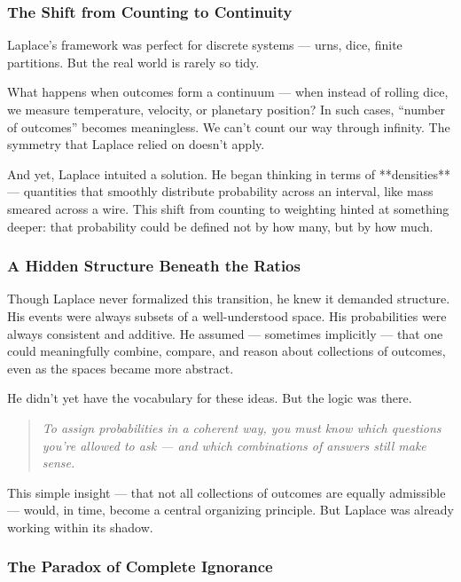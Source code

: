 \subsubsection*{The Shift from Counting to Continuity}

Laplace’s framework was perfect for discrete systems — urns, dice, finite partitions. But the real world is rarely so tidy.

What happens when outcomes form a continuum — when instead of rolling dice, we measure temperature, velocity, or planetary position? In such cases, “number of outcomes” becomes meaningless. We can’t count our way through infinity. The symmetry that Laplace relied on doesn’t apply.

And yet, Laplace intuited a solution. He began thinking in terms of **densities** — quantities that smoothly distribute probability across an interval, like mass smeared across a wire. This shift from counting to weighting hinted at something deeper: that probability could be defined not by how many, but by how much.

\subsubsection*{A Hidden Structure Beneath the Ratios}

Though Laplace never formalized this transition, he knew it demanded structure. His events were always subsets of a well-understood space. His probabilities were always consistent and additive. He assumed — sometimes implicitly — that one could meaningfully combine, compare, and reason about collections of outcomes, even as the spaces became more abstract.

He didn’t yet have the vocabulary for these ideas. But the logic was there.

\begin{quote}
    \textit{To assign probabilities in a coherent way, you must know which questions you’re allowed to ask — and which combinations of answers still make sense.}
\end{quote}

This simple insight — that not all collections of outcomes are equally admissible — would, in time, become a central organizing principle. But Laplace was already working within its shadow.

\subsubsection*{The Paradox of Complete Ignorance}

